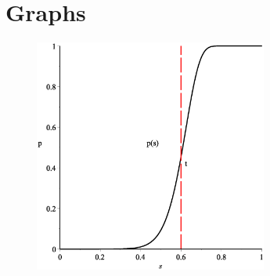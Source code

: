 \section{Graphs}\label{sec:graph}
\begin{figure}[H]
	\includegraphics[width=290px]{img/pGraphGood.eps}
	\label{fig:p_graph_good}
\end{figure}